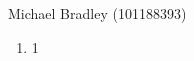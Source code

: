 \documentclass[11pt]{article}
\begin{document}
\begin{center}
	Michael Bradley (101188393)
\end{center}

\begin{enumerate}
	\item 1
\end{enumerate}
\end{document}
